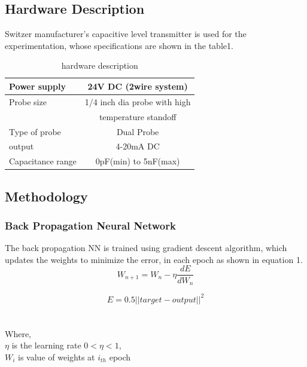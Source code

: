 \documentclass[conference]{IEEEtran}
\begin{document}
 

\subsection{Hardware Description}
Switzer manufacturer’s capacitive level transmitter is used for the experimentation, whose specifications are shown in the table1.
\begin{table}[htdp]
\begin{center}
  \begin{tabular}{ | l | c |}
    \hline
    Power supply   & 24V DC (2wire system) \\ \hline
    Probe size     & 1/4 inch dia probe with high\\ 
                   & temperature standoff \\ \hline
    Type of probe  & Dual Probe \\ \hline
    output         & 4-20mA DC \\ \hline
    Capacitance range  & 0pF(min) to 5nF(max) \\ \hline
  \end{tabular}
\end{center}
 \caption{hardware description}\label{tab:a}
\end{table}
\subsection{Methodology}
\subsubsection{Back Propagation Neural Network}
The back propagation NN is trained using gradient descent algorithm, which updates the weights to minimize the error, in each epoch as shown in equation 1. \\
\begin{equation} \label{eq:1}
W_{n+1} = W_n-\eta \frac{dE}{dW_n}
\end{equation}

\begin{equation} \label{eq:2}
E = 0.5 ||target-output||^2
\end{equation}\\
\\
Where,\\
$\eta$ is the learning rate $0<\eta<1$, \\
$W_i$ is value of weights at $i_{th}$ epoch
\end{document}
